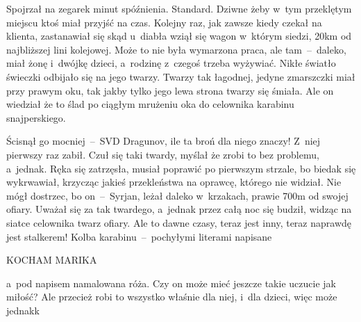 \documentclass[../MAIN.tex]{subfiles}
\begin{document}
Spojrzał na zegarek
\sd
{} minut spóźnienia. Standard. Dziwne
żeby w~tym przeklętym miejscu ktoś miał przyjść na czas.
\qd
Kolejny raz, jak zawsze kiedy czekał na klienta, zastanawiał
się skąd u~diabła wziął się wagon w~którym siedzi, 20km od
najbliższej lini kolejowej. Może to nie była wymarzona praca,
ale tam~--~daleko, miał żonę i~dwójkę dzieci, a~rodzinę
z~czegoś
trzeba wyżywiać. Nikłe światło świeczki odbijało się na jego
twarzy. Twarzy tak łagodnej, jedyne zmarszczki miał przy prawym
oku, tak jakby tylko jego lewa strona twarzy się śmiała. Ale on
wiedział że to ślad po ciągłym mrużeniu oka do celownika
karabinu \mbox{snajperskiego}.

Ścisnął go mocniej~--~SVD Dragunov, ile
ta broń dla niego znaczy! Z~niej pierwszy raz zabił. Czuł się
taki twardy, myślał że zrobi to bez problemu, a~jednak. Ręka
się zatrzęsła, musiał poprawić po pierwszym strzale, bo biedak
się wykrwawiał, krzycząc jakieś przekleństwa na oprawcę,
którego nie widział. Nie mógł dostrzec, bo on~--~Syrjan, leżał
daleko w~krzakach, prawie 700m od swojej ofiary. Uważał się za
tak twardego, a~jednak przez całą noc się budził, widząc na
siatce celownika twarz ofiary. Ale to dawne czasy, teraz jest
inny, teraz naprawdę jest stalkerem! Kolba
karabinu~--~pochyłymi
literami napisane
%
\centerline{KOCHAM MARIKA}
%
a~pod napisem namalowana róża.
Czy on może mieć jeszcze takie uczucie jak miłość? Ale przecież
robi to wszystko właśnie dla niej, i~dla dzieci, więc może
jednak\3k
\end{document}
